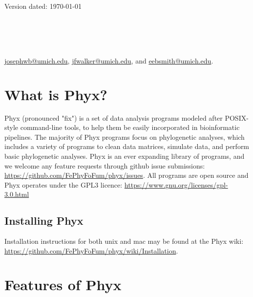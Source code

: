 \documentclass[12pt,letterpaper]{memoir}
\begin{document}
\begin{flushright}
Version dated: \today
\end{flushright}
\bigskip

\\
\\
\\
\\

\medskip
{} \href{josephwb@umich.edu}{josephwb@umich.edu}, \href{jfwalker@umich.edu}{jfwalker@umich.edu}, and \href{eebsmith@umich.edu}{eebsmith@umich.edu}.\\
\medskip

\section{What is Phyx?}\label{abstract}
Phyx (pronounced "fix") is a set of data analysis programs modeled after POSIX-style command-line tools, to help them be easily incorporated in bioinformatic pipelines. The majority of Phyx programs focus on phylogenetic analyses, which includes a variety of programs to clean data matrices, simulate data, and perform basic phylogenetic analyses. Phyx is an ever expanding library of programs, and we welcome any feature requests through github issue submissions: \href{https://github.com/FePhyFoFum/phyx/issues}{https://github.com/FePhyFoFum/phyx/issues}. 
All programs are open source and Phyx operates under the GPL3 licence: \href{https://www.gnu.org/licenses/gpl-3.0.html}{https://www.gnu.org/licenses/gpl-3.0.html}

\subsection{Installing Phyx}\label{introduction}
\begin{flushleft}
Installation instructions for both unix and mac may be found at the Phyx wiki: \href{https://github.com/FePhyFoFum/phyx/wiki/Installation}{https://github.com/FePhyFoFum/phyx/wiki/Installation}.
\end{flushleft}

\section{Features of Phyx}
\end{document}
